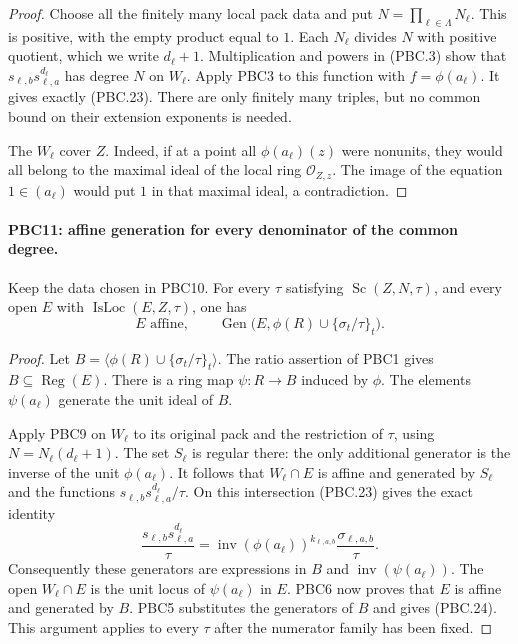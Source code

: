 \begin{proof}
Choose all the finitely many local pack data and put
$N=\prod_{\ell\in\Lambda}N_\ell$.  This is positive, with
the empty product equal to $1$.  Each $N_\ell$ divides $N$
with positive quotient, which we write $d_\ell+1$.
Multiplication and powers in (PBC.3) show that
$s_{\ell,b}s_{\ell,a}^{d_\ell}$ has degree $N$ on
$W_\ell$.  Apply PBC3 to this function with
$f=\phi(a_\ell)$.  It gives exactly (PBC.23).
There are only finitely many triples, but no common bound on their
extension exponents is needed.

The $W_\ell$ cover $Z$.  Indeed, if at a point all
$\phi(a_\ell)(z)$ were nonunits, they would all belong to the
maximal ideal of the local ring $\mathcal O_{Z,z}$.
The image of the equation $1\in(a_\ell)$ would put $1$ in that
maximal ideal, a contradiction.
\end{proof}

\paragraph{PBC11: affine generation for every denominator of the common degree.}
\label{claim:PBC11}
Keep the data chosen in PBC10.  For every $\tau$ satisfying
$\operatorname{Sc}(Z,N,\tau)$, and every open $E$ with
$\operatorname{IsLoc}(E,Z,\tau)$, one has
\[
 E\text{ affine},\qquad
 \operatorname{Gen}\bigl(E,\phi(R)\cup\{\sigma_t/\tau\}_t\bigr).
                                                        \tag{PBC.24}
\]

\begin{proof}
Let $B=\langle\phi(R)\cup\{\sigma_t/\tau\}_t\rangle$.
The ratio assertion of PBC1 gives $B\subseteq\operatorname{Reg}(E)$.
There is a ring map $\psi:R\to B$ induced by $\phi$.
The elements $\psi(a_\ell)$ generate the unit ideal of $B$.

Apply PBC9 on $W_\ell$ to its original pack and the restriction
of $\tau$, using $N=N_\ell(d_\ell+1)$.
The set $S_\ell$ is regular there: the only additional generator
is the inverse of the unit $\phi(a_\ell)$.
It follows that $W_\ell\cap E$ is affine and generated by
$S_\ell$ and the functions
$s_{\ell,b}s_{\ell,a}^{d_\ell}/\tau$.
On this intersection (PBC.23) gives the exact identity
\[
 \frac{s_{\ell,b}s_{\ell,a}^{d_\ell}}{\tau}
   =\operatorname{inv}(\phi(a_\ell))^{k_{\ell,a,b}}
               \frac{\sigma_{\ell,a,b}}{\tau}.
                                                        \tag{PBC.25}
\]
Consequently these generators are expressions in $B$ and
$\operatorname{inv}(\psi(a_\ell))$.  The open
$W_\ell\cap E$ is the unit locus of $\psi(a_\ell)$ in $E$.
PBC6 now proves that $E$ is affine and generated by $B$.
PBC5 substitutes the generators of $B$ and gives (PBC.24).
This argument applies to every $\tau$ after the numerator family
has been fixed.
\end{proof}

